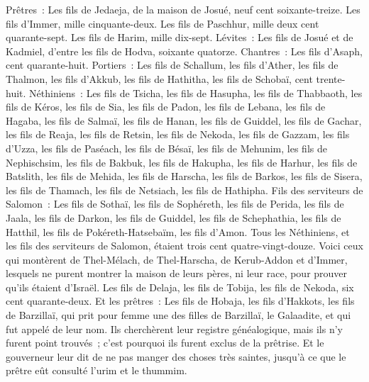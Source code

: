 \begin{multicols}{2}
Prêtres~: Les fils de Jedaeja, de la maison de Josué, neuf cent soixante-treize.
Les fils d'Immer, mille cinquante-deux.
Les fils de Paschhur, mille deux cent quarante-sept.
Les fils de Harim, mille dix-sept.
Lévites~: Les fils de Josué et de Kadmiel, d'entre les fils de Hodva, soixante quatorze.
Chantres~: Les fils d'Asaph, cent quarante-huit.
Portiers~: Les fils de Schallum, les fils d'Ather, les fils de Thalmon, les fils d'Akkub, les fils de Hathitha, les fils de Schobaï, cent trente-huit.
Néthiniens~: Les fils de Tsicha, les fils de Hasupha, les fils de Thabbaoth,
les fils de Kéros, les fils de Sia, les fils de Padon,
les fils de Lebana, les fils de Hagaba, les fils de Salmaï,
les fils de Hanan, les fils de Guiddel, les fils de Gachar,
les fils de Reaja, les fils de Retsin, les fils de Nekoda,
les fils de Gazzam, les fils d'Uzza, les fils de Paséach,
les fils de Bésaï, les fils de Mehunim, les fils de Nephischsim,
les fils de Bakbuk, les fils de Hakupha, les fils de Harhur,
les fils de Batslith, les fils de Mehida, les fils de Harscha,
les fils de Barkos, les fils de Sisera, les fils de Thamach,
les fils de Netsiach, les fils de Hathipha.
Fils des serviteurs de Salomon~: Les fils de Sothaï, les fils de Sophéreth, les fils de Perida,
les fils de Jaala, les fils de Darkon, les fils de Guiddel,
les fils de Schephathia, les fils de Hatthil, les fils de Pokéreth-Hatsebaïm, les fils d'Amon.
Tous les Néthiniens, et les fils des serviteurs de Salomon, étaient trois cent quatre-vingt-douze.
Voici ceux qui montèrent de Thel-Mélach, de Thel-Harscha, de Kerub-Addon et d'Immer, lesquels ne purent montrer la maison de leurs pères, ni leur race, pour prouver qu'ils étaient d'Israël.
Les fils de Delaja, les fils de Tobija, les fils de Nekoda, six cent quarante-deux.
Et les prêtres~: Les fils de Hobaja, les fils d'Hakkots, les fils de Barzillaï, qui prit pour femme une des filles de Barzillaï, le Galaadite, et qui fut appelé de leur nom.
Ils cherchèrent leur registre généalogique, mais ils n'y furent point trouvés~; c'est pourquoi ils furent exclus de la prêtrise.
Et le gouverneur leur dit de ne pas manger des choses très saintes, jusqu'à ce que le prêtre eût consulté l'urim et le thummim.

\end{multicols}
